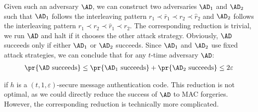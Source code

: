 \documentclass{crypto-exercise}
\begin{document}
\begin{solution}
Given such an adversary $\AD$, we can construct two adversaries $\AD_1$ and $\AD_2$ such that $\AD_1$ follows the interleaving pattern $r_1 \prec \bar{r}_1
\prec r_2 \prec \hat{r}_2$ and $\AD_2$ follows the interleaving pattern  $r_1 \prec r_2 \prec \hat{r}_1 \prec \hat{r}_2$. The corresponding reduction is trivial, we run $\AD$ and halt if it chooses the other attack strategy. Obviously, $\AD$ succeeds only if either $\AD_1$ or $\AD_2$ succeeds. Since $\AD_1$ and $\AD_2$ use fixed attack strategies, we can conclude that for any $t$-time adversary $\AD$:
\begin{align*}
\pr{\AD \text{ succeeds}}\leq \pr{\AD_1 \text{ succeeds}}+ \pr{\AD_2 \text{ succeeds}}\leq 2\varepsilon
\end{align*}      
\end{solution}
if $h$ is a $(t,1,\varepsilon)$-secure message authentication code. This reduction is not optimal, as we could directly reduce the success of $\AD$ to MAC forgeries. However, the corresponding reduction is technically more complicated.
\end{document}
